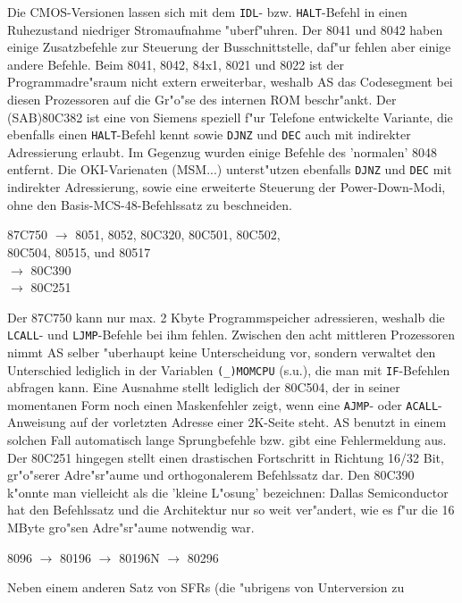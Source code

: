 \documentclass[12pt,a4paper,twoside]{report}
\newcommand{\tty}[1]{{\tt #1}}
\newcommand{\asname}{AS}
\newcommand{\predefsym}[1]{{\tt (\_)#1}}
\begin{document}
Die CMOS-Versionen lassen
sich mit dem \tty{IDL}- bzw. \tty{HALT}-Befehl in einen Ruhezustand niedriger
Stromaufnahme "uberf"uhren.  Der 8041 und 8042 haben einige Zusatzbefehle zur
Steuerung der Busschnittstelle, daf"ur fehlen aber einige andere Befehle.
Beim 8041, 8042, 84x1, 8021 und 8022 ist der Programmadre"sraum nicht
extern erweiterbar, weshalb \asname{} das Codesegment bei diesen Prozessoren
auf die Gr"o"se des internen ROM beschr"ankt.  Der (SAB)80C382 ist eine von
Siemens speziell f"ur Telefone entwickelte Variante, die ebenfalls
einen \tty{HALT}-Befehl kennt sowie \tty{DJNZ} und \tty{DEC} auch
mit indirekter Adressierung erlaubt.  Im Gegenzug wurden einige
Befehle des 'normalen' 8048 entfernt. Die OKI-Varienaten (MSM...)
unterst"utzen ebenfalls \tty{DJNZ} und \tty{DEC} mit indirekter
Adressierung, sowie eine erweiterte Steuerung der
Power-Down-Modi, ohne den Basis-MCS-48-Befehlssatz zu
beschneiden.
\begin{cpulist}
   87C750 $\rightarrow$ 8051, 8052, 80C320, 80C501, 80C502, \\
\> 80C504, 80515, und 80517 \\
\> $\rightarrow$ 80C390 \\
\> $\rightarrow$ 80C251
\end{cpulist}
Der 87C750 kann nur max. 2 Kbyte Programmspeicher adressieren, weshalb
die \tty{LCALL}- und \tty{LJMP}-Befehle bei ihm fehlen.  Zwischen den
acht mittleren Prozessoren nimmt \asname{} selber "uberhaupt keine Unterscheidung
vor, sondern verwaltet den Unterschied lediglich in der Variablen
\predefsym{MOMCPU} (s.u.), die man mit \tty{IF}-Befehlen abfragen kann.  Eine
Ausnahme stellt lediglich der 80C504, der in seiner momentanen Form noch einen
Maskenfehler zeigt, wenn eine \tty{AJMP}- oder \tty{ACALL}-Anweisung auf der
vorletzten Adresse einer 2K-Seite steht.  \asname{} benutzt in einem solchen
Fall automatisch lange Sprungbefehle bzw. gibt eine Fehlermeldung aus.  Der
80C251 hingegen stellt einen drastischen Fortschritt in Richtung 16/32 Bit,
gr"o"serer Adre"sr"aume und orthogonalerem Befehlssatz dar.  Den 80C390
k"onnte man vielleicht als die 'kleine L"osung' bezeichnen:  Dallas
Semiconductor hat den Befehlssatz und die Architektur nur so weit
ver"andert, wie es f"ur die 16 MByte gro"sen Adre"sr"aume notwendig war.
\begin{cpulist}
   8096 $\rightarrow$ 80196 $\rightarrow$ 80196N $\rightarrow$ 80296
\end{cpulist}
Neben einem anderen Satz von SFRs (die "ubrigens von Unterversion zu
\end{document}

